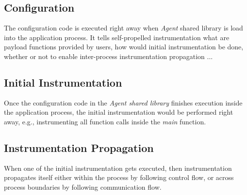 \subsection{Configuration}
The configuration code is executed right away when {\em Agent} shared library is
load into the application process.
It tells self-propelled instrumentation what are payload functions provided by
users, how would initial instrumentation be done, whether or not to enable
inter-process instrumentation propagation ...

\subsection{Initial Instrumentation}
Once the configuration code in the {\em Agent shared library} finishes execution
inside the application process, the initial instrumentation would be performed
right away, e.g., instrumenting all function calls inside the {\em main}
function.

\subsection{Instrumentation Propagation}
When one of the initial instrumentation gets executed, then instrumentation
propagates itself either within the process by following control flow, or across
process boundaries by following communication flow.



